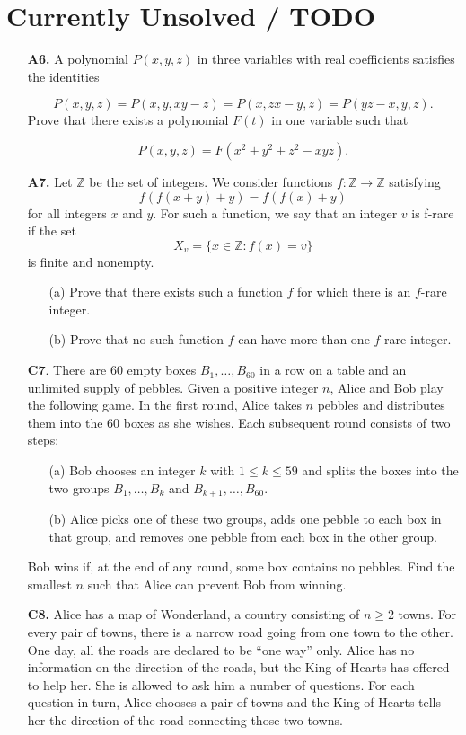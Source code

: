 \documentclass[11pt,a4paper]{article}
\begin{document}
\section*{Currently Unsolved / TODO}
\begin{enumerate}
	\item [\textbf{A6.}] A polynomial $P(x, y, z)$ in three variables with real coefficients satisfies the identities
	
	$$P(x, y, z)=P(x, y, xy-z)=P(x, zx-y, z)=P(yz-x, y, z).$$
	Prove that there exists a polynomial $F(t)$ in one variable such that
	
	$$P(x,y,z)=F(x^2+y^2+z^2-xyz).$$
	
	\item [\textbf{A7.}] Let $\mathbb Z$ be the set of integers. We consider functions $f :\mathbb Z\to\mathbb Z$ satisfying
	\[f\left(f(x+y)+y\right)=f\left(f(x)+y\right)\]for all integers $x$ and $y$. For such a function, we say that an integer $v$ is f-rare if the set
	\[X_v=\{x\in\mathbb Z:f(x)=v\}\]is finite and nonempty.
	\begin{enumerate}
		\item [(a)] Prove that there exists such a function $f$ for which there is an $f$-rare integer.
		\item [(b)] Prove that no such function $f$ can have more than one $f$-rare integer.
	\end{enumerate}
	
	\item [\textbf{C7}.] There are 60 empty boxes $B_1,\ldots,B_{60}$ in a row on a table and an unlimited supply of pebbles. Given a positive integer $n$, Alice and Bob play the following game.
	In the first round, Alice takes $n$ pebbles and distributes them into the 60 boxes as she wishes. Each subsequent round consists of two steps:
	\begin{enumerate}
		\item[(a)] Bob chooses an integer $k$ with $1\leq k\leq 59$ and splits the boxes into the two groups $B_1,\ldots,B_k$ and $B_{k+1},\ldots,B_{60}$.
		\item[(b)] Alice picks one of these two groups, adds one pebble to each box in that group, and removes one pebble from each box in the other group.
	\end{enumerate}
	Bob wins if, at the end of any round, some box contains no pebbles. Find the smallest $n$ such that Alice can prevent Bob from winning.
	
	\item [\textbf{C8.}] Alice has a map of Wonderland, a country consisting of $n \geq 2$ towns. For every pair of towns, there is a narrow road going from one town to the other. One day, all the roads are declared to be “one way” only. Alice has no information on the direction of the roads, but the King of Hearts has offered to help her. She is allowed to ask him a number of questions. For each question in turn, Alice chooses a pair of towns and the King of Hearts tells her the direction of the road connecting those two towns.
	

\end{enumerate}
\end{document}

